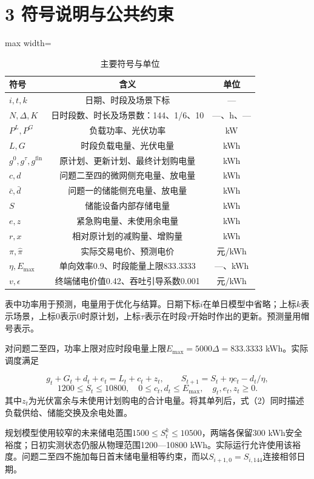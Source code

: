 \documentclass[UTF8,a4paper,zihao=-4,fontset=windows]{ctexart}
\begin{document}
\section{3 符号说明与公共约束}
\begin{table}[H]\centering
\fontsize{9.5}{12}\selectfont\setlength{\tabcolsep}{4pt}\renewcommand{\arraystretch}{1.12}
\begin{adjustbox}{max width=\linewidth}\begin{tabular}{lcc}\toprule
\textbf{符号} & \textbf{含义} & \textbf{单位}\\\midrule
$i,t,k$ & 日期、时段及场景下标 & —\\
$N,\Delta,K$ & 日时段数、时长及场景数：144、1/6、10 & —、h、—\\
$P^L,P^G$ & 负载功率、光伏功率 & kW\\
$L,G$ & 时段负载电量、光伏电量 & kWh\\
$g^0,g^{\tau},g^{\mathrm{fin}}$ & 原计划、更新计划、最终计划购电量 & kWh\\
$c,d$ & 问题二至四的微网侧充电量、放电量 & kWh\\
$\bar c,\bar d$ & 问题一的储能侧充电量、放电量 & kWh\\
$S$ & 储能设备内部存储电量 & kWh\\
$e,z$ & 紧急购电量、未使用余电量 & kWh\\
$r,x$ & 相对原计划的减购量、增购量 & kWh\\
$\pi,\widehat\pi$ & 实际交易电价、预测电价 & 元/kWh\\
$\eta,E_{\max}$ & 单向效率0.9、时段能量上限833.3333 & —、kWh\\
$v,\epsilon$ & 终端储电价值0.42、吞吐引导系数0.001 & 元/kWh\\
\bottomrule\end{tabular}\end{adjustbox}
\caption{主要符号与单位}
\end{table}
表中功率用于预测，电量用于优化与结算。日期下标$i$在单日模型中省略；上标$k$表示场景，上标0表示0时原计划，上标$\tau$表示在时段$\tau$开始时作出的更新。预测量用帽号表示。
\par
对问题二至四，功率上限对应时段电量上限$E_{\max}=5000\Delta=833.3333$ kWh。实际调度满足
\par
\begin{equation}
g_t+G_t+d_t+e_t=L_t+c_t+z_t,\qquad S_{t+1}=S_t+\eta c_t-d_t/\eta, \tag{2}
\end{equation}
\begin{equation}
1200\le S_t\le10800,\quad 0\le c_t,d_t\le E_{\max},\quad g_t,e_t,z_t\ge0. \tag{3}
\end{equation}
其中$z_t$为光伏富余与未使用计划购电的合计电量。将其单列后，式（2）同时描述负载供给、储能交换及余电处置。
\par
规划模型使用较窄的未来储电范围$1500\le S_t^k\le10500$，两端各保留300 kWh安全裕度；日初实测状态仍服从物理范围1200—10800 kWh。实际运行允许使用该裕度。问题二至四不施加每日首末储电量相等约束，而以$S_{i+1,0}=S_{i,144}$连接相邻日期。
\par
\end{document}
